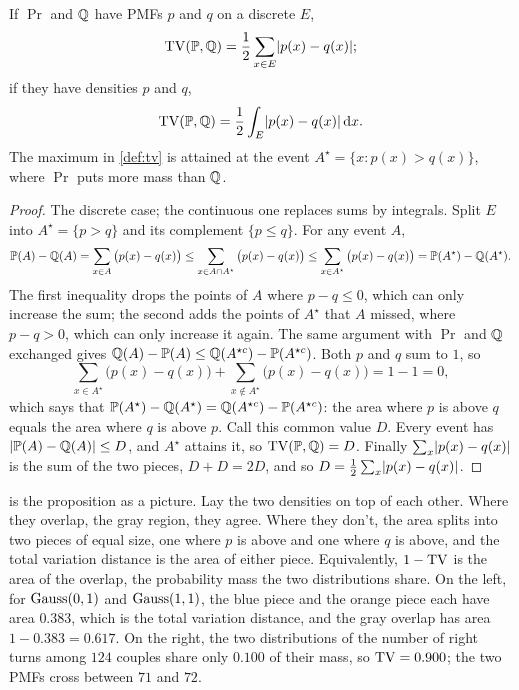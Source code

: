 \begin{proposition}
\label{prop:tv-area}
If $\Pr$ and $\mathbb{Q}$ have PMFs $p$ and $q$ on a discrete $E$,
\[
\mathrm{TV}(\mathbb{P}, \mathbb{Q}) = \frac12 \sum_{x \in E} \lvert p(x) - q(x)\rvert;
\]
if they have densities $p$ and $q$,
\[
\mathrm{TV}(\mathbb{P}, \mathbb{Q}) = \frac12 \int_E \lvert p(x) - q(x)\rvert \, \mathrm{d}x.
\]
The maximum in \cref{def:tv} is attained at the event $A^\star = \{x : p(x) > q(x)\}$, where $\Pr$ puts more mass than $\mathbb{Q}$.
\end{proposition}

\begin{proof}
The discrete case; the continuous one replaces sums by integrals.
Split $E$ into $A^\star = \{p > q\}$ and its complement $\{p \leq q\}$.
For any event $A$,
\[
\mathbb{P}(A) - \mathbb{Q}(A) = \sum_{x \in A} \big(p(x) - q(x)\big) \leq \sum_{x \in A \cap A^\star} \big(p(x) - q(x)\big) \leq \sum_{x \in A^\star} \big(p(x) - q(x)\big) = \mathbb{P}(A^\star) - \mathbb{Q}(A^\star).
\]
The first inequality drops the points of $A$ where $p - q \leq 0$, which can only increase the sum; the second adds the points of $A^\star$ that $A$ missed, where $p - q > 0$, which can only increase it again.
The same argument with $\Pr$ and $\mathbb{Q}$ exchanged gives $\mathbb{Q}(A) - \mathbb{P}(A) \leq \mathbb{Q}(A^{\star c}) - \mathbb{P}(A^{\star c})$.
Both $p$ and $q$ sum to $1$, so
\[
\sum_{x \in A^\star} \big(p(x) - q(x)\big) + \sum_{x \notin A^\star} \big(p(x) - q(x)\big) = 1 - 1 = 0,
\]
which says that $\mathbb{P}(A^\star) - \mathbb{Q}(A^\star) = \mathbb{Q}(A^{\star c}) - \mathbb{P}(A^{\star c})$: the area where $p$ is above $q$ equals the area where $q$ is above $p$.
Call this common value $D$.
Every event has $\lvert\mathbb{P}(A) - \mathbb{Q}(A)\rvert \leq D$, and $A^\star$ attains it, so $\mathrm{TV}(\mathbb{P}, \mathbb{Q}) = D$.
Finally $\sum_x \lvert p(x) - q(x)\rvert$ is the sum of the two pieces, $D + D = 2D$, and so $D = \frac12 \sum_x \lvert p(x) - q(x)\rvert$.
\end{proof}

 is the proposition as a picture.
Lay the two densities on top of each other.
Where they overlap, the gray region, they agree.
Where they don't, the area splits into two pieces of equal size, one where $p$ is above and one where $q$ is above, and the total variation distance is the area of either piece.
Equivalently, $1 - \mathrm{TV}$ is the area of the overlap, the probability mass the two distributions share.
On the left, for $\text{Gauss}(0,1)$ and $\text{Gauss}(1,1)$, the blue piece and the orange piece each have area $0.383$, which is the total variation distance, and the gray overlap has area $1 - 0.383 = 0.617$.
On the right, the two distributions of the number of right turns among $124$ couples share only $0.100$ of their mass, so $\mathrm{TV} = 0.900$; the two PMFs cross between $71$ and $72$.

